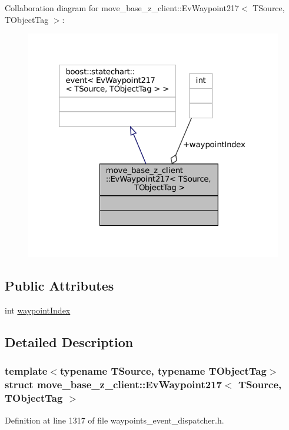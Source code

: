 Collaboration diagram for move\+\_\+base\+\_\+z\+\_\+client\+:\+:Ev\+Waypoint217$<$ T\+Source, T\+Object\+Tag $>$\+:
\nopagebreak
\begin{figure}[H]
\begin{center}
\leavevmode
\includegraphics[width=320pt]{structmove__base__z__client_1_1EvWaypoint217__coll__graph}
\end{center}
\end{figure}
\subsection*{Public Attributes}
\begin{DoxyCompactItemize}
\item 
int \hyperlink{structmove__base__z__client_1_1EvWaypoint217_af261221b3697b52db5b6a593f2b84e83}{waypoint\+Index}
\end{DoxyCompactItemize}


\subsection{Detailed Description}
\subsubsection*{template$<$typename T\+Source, typename T\+Object\+Tag$>$\newline
struct move\+\_\+base\+\_\+z\+\_\+client\+::\+Ev\+Waypoint217$<$ T\+Source, T\+Object\+Tag $>$}



Definition at line 1317 of file waypoints\+\_\+event\+\_\+dispatcher.\+h.




